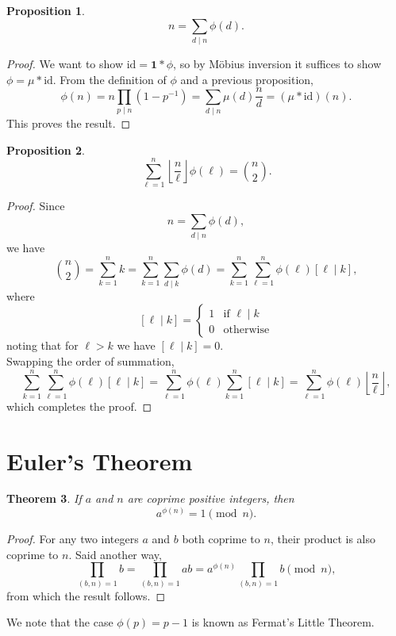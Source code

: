 \documentclass{amsbook}
\numberwithin{section}{chapter}
\theoremstyle{plain}
\newtheorem{thm}{Theorem}[section]
\newtheorem{prop}[thm]{Proposition}
\theoremstyle{definition}
\def\br{~\\[1em]}
\def\id{\text{id}}
\begin{document}
\begin{prop}
\[n = \sum_{d\mid n}\phi(d).\]
\end{prop}
\begin{proof}
We want to show $\id = \boldsymbol 1 *\phi$, so by M\"obius inversion
it suffices to show $\phi = \mu*\id$. From
the definition of $\phi$ and a previous proposition,
\[\phi(n) = n\prod_{p\mid n}(1 - p^{-1})
= \sum_{d\mid n}\mu(d)\frac{n}{d}
= (\mu * \id)(n).\]
This proves the result.
\end{proof}
\begin{prop}
\[\sum_{\ell=1}^n\left\lfloor\frac{n}{\ell}\right\rfloor\phi(\ell)
= {n\choose 2}.\]
\end{prop}
\begin{proof}
Since
\[n = \sum_{d\mid n}\phi(d),\]
we have
\[{n\choose 2} = \sum_{k=1}^nk = \sum_{k=1}^n\sum_{d\mid k}\phi(d)
= \sum_{k=1}^n\sum_{\ell=1}^n\phi(\ell)[\ell\mid k],\]
where 
\[[\ell\mid k] = \begin{cases}
1 &\text{if } \ell\mid k\\
0 &\text{otherwise}
\end{cases}\]
noting that for $\ell > k$ we have $[\ell\mid k] = 0$.
\br
Swapping the order of summation,
\[\sum_{k=1}^n\sum_{\ell=1}^n\phi(\ell)[\ell\mid k]
= 
\sum_{\ell=1}^n\phi(\ell)\sum_{k=1}^n[\ell\mid k]
= \sum_{\ell=1}^n\phi(\ell)\left\lfloor\frac{n}{\ell}\right\rfloor,
\]
which completes the proof.
\end{proof}
\section{Euler's Theorem}
\begin{thm}
If $a$ and $n$ are coprime positive integers, then
\[a^{\phi(n)} = 1\pmod n.\]
\end{thm}
\begin{proof}
For any two integers $a$ and $b$ both coprime to $n$,
their product is also coprime to $n$. Said another way,
\[\prod_{(b, n) = 1}b
= \prod_{(b, n) = 1}ab = a^{\phi(n)}\prod_{(b, n) = 1}b\pmod n,\]
from which the result follows.
\end{proof}
We note that the case $\phi(p) = p - 1$ is known as
Fermat's Little Theorem.
\end{document}

